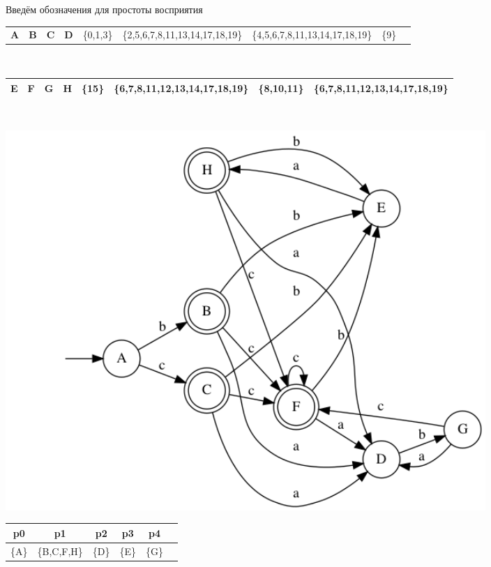 \documentclass{article}
\begin{document}
\begin{enumerate}
    Введём обозначения для простоты восприятия
    \begin{center}
        \begin{tabular}{|c|c|c|c|}
        \hline
        \textbf{A} & \textbf{B} & \textbf{C}& \textbf{D}& 
        \hline
        \{0,1,3\}&
        \{2,5,6,7,8,11,13,14,17,18,19\}&
        \{4,5,6,7,8,11,13,14,17,18,19\}&
        \{9\}&
        \hline
        \end{tabular} \\
    \end{center}
    \begin{center}
        \begin{tabular}{|c|c|c|c|}
        \hline
        \textbf{E} & \textbf{F} & \textbf{G}& \textbf{H}&
        \hline
        \{15\}&
        \{6,7,8,11,12,13,14,17,18,19\}&
        \{8,10,11\}&
        \{6,7,8,11,12,13,14,17,18,19\} \\
        \hline
        \end{tabular} \\
    \end{center}
    \begin{center}
        \includegraphics[width=0.8\textwidth]{g34_dka.png}
    \end{center}
    \begin{center}
        \begin{tabular}{|c|c|c|c|c|}
        \hline
        \textbf{p0} & \textbf{p1} & \textbf{p2}& \textbf{p3}& \textbf{p4} \\
        \hline
        \{A\}&
        \{B,C,F,H\}&
        \{D\}&
        \{E\}&
        \{G\}&
        \hline
        \end{tabular} \\
    \end{center}
    

\end{enumerate}
\end{document}
